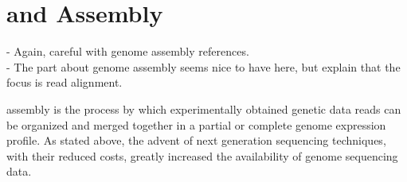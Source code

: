 
\section{\rnaseq{} and \Trans{} Assembly}\label{sec:assembly}

\begin{Notes}
- Again, careful with genome assembly references.\\
- The part about genome assembly seems nice to have here, but explain that the
focus is read alignment.\\
\end{Notes}

\Trans{} assembly is the process by which experimentally obtained genetic data
reads can be organized and merged together in a partial or complete genome
expression profile. As stated above, the advent of next generation sequencing
techniques, with their reduced costs, greatly increased the availability of
genome sequencing data.


